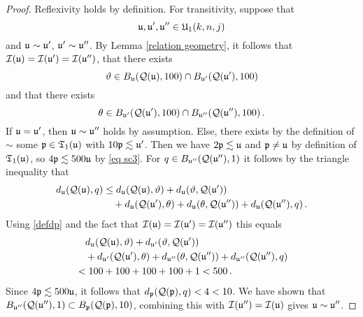 {\begin{proof}
    Reflexivity holds by definition.
    For transitivity, suppose that
    \begin{equation*}
        \mathfrak u, \mathfrak u', \mathfrak u'' \in \mathfrak U_1(k,n,j)
    \end{equation*}
    and $\mathfrak u \sim \mathfrak u'$, $\mathfrak u' \sim \mathfrak u''$.
    By Lemma \ref{relation geometry}, it follows that $\mathcal{I}(\mathfrak u) =\mathcal{I}(\mathfrak u') = \mathcal{I}(\mathfrak u'')$, that there exists
    \begin{equation*}
        \vartheta \in B_{\mathfrak u}(\mathcal{Q}(\mathfrak u), 100) \cap B_{\mathfrak u'}(\mathcal{Q}(\mathfrak u'), 100)
    \end{equation*}
    and that there exists
    \begin{equation*}
        \theta \in B_{\mathfrak u'}(\mathcal{Q}(\mathfrak u'), 100) \cap B_{\mathfrak u''}(\mathcal{Q}(\mathfrak u''), 100)\, .
    \end{equation*}
    If $\mathfrak u = \mathfrak u'$, then $\mathfrak u \sim \mathfrak u''$ holds by assumption. Else, there exists by the definition of $\sim$ some $\mathfrak p \in \mathfrak{T}_1(\mathfrak u)$ with $10\mathfrak p\lesssim \mathfrak u'$.
    Then we have $2\mathfrak p \lesssim \mathfrak u$  and $\mathfrak p \ne \mathfrak u$ by definition of $\mathfrak{T}_1(\mathfrak u)$,  so $4 \mathfrak p \lesssim 500 \mathfrak u$ by \eqref{eq sc3}. For $q \in B_{\mathfrak u''}(\mathcal{Q}(\mathfrak u''), 1)$ it follows by the triangle inequality that
    \begin{align*}
        d_{\mathfrak u}(\mathcal{Q}(\mathfrak u), q) &\le d_{\mathfrak u}(\mathcal{Q}(\mathfrak u), \vartheta) + d_{\mathfrak u}(\vartheta, \mathcal{Q}(\mathfrak u'))\\
        &\quad+ d_{\mathfrak u}(\mathcal{Q}(\mathfrak u'), \theta) + d_{\mathfrak u}(\theta, \mathcal{Q}(\mathfrak u'')) +
        d_{\mathfrak u}(\mathcal{Q}(\mathfrak u''), q)\,.
    \end{align*}
    Using \eqref{defdp} and the fact that $\mathcal{I}(\mathfrak u) = \mathcal{I}(\mathfrak u') = \mathcal{I}(\mathfrak u'')$ this equals
    \begin{align*}
        &\quad d_{\mathfrak u}(\mathcal{Q}(\mathfrak u), \vartheta) + d_{\mathfrak u'}(\vartheta, \mathcal{Q}(\mathfrak u'))\\
        &\quad+ d_{\mathfrak u'}(\mathcal{Q}(\mathfrak u'), \theta) + d_{\mathfrak u''}(\theta, \mathcal{Q}(\mathfrak u'')) +
        d_{\mathfrak u''}(\mathcal{Q}(\mathfrak u''), q)\\
        &< 100 + 100 + 100 + 100 + 1 < 500\,.
    \end{align*}
    Since $4\mathfrak p \lesssim 500 \mathfrak u$, it follows that $d_{\mathfrak p}(\mathcal{Q}(\mathfrak p), q) < 4 < 10$. We have shown that $B_{\mathfrak u''}(\mathcal{Q}(\mathfrak u''), 1) \subset B_{\mathfrak p}(\mathcal{Q}(\mathfrak p), 10)$, combining this with $\mathcal{I}(\mathfrak u'') = \mathcal{I}(\mathfrak u)$ gives $\mathfrak u \sim \mathfrak u''$.


\end{proof}}
